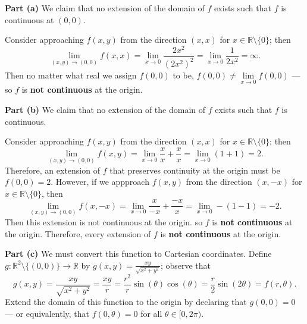 \documentclass[11pt]{article}
\begin{document}
\textbf{Part (a)} We claim that no extension of the domain of $f$ exists such that $f$ is continuous at $(0, 0)$.

Consider approaching $f(x, y)$ from the direction $(x, x)$ for $x \in \mathbb{R} \setminus \{ 0 \}$; then 
\[
	\lim\limits_{(x, y) \to (0, 0)} f(x, x) = \lim\limits_{x \to 0} \frac{2x^{2}}{(2x^{2})^{2}} = \lim\limits_{x \to 0} \frac{1}{2x^{2}} = \infty.
\]
Then no matter what real we assign $f(0, 0)$ to be, $f(0, 0) \ne \lim\limits_{x \to 0} f(0, 0)$ --- so $f$ is \textbf{not continuous} at the origin. 


\textbf{Part (b)} We claim that no extension of the domain of $f$ exists such that $f$ is continuous.

Consider approaching $f(x, y)$ from the direction $(x, x)$ for $x \in \mathbb{R} \setminus \{ 0 \}$; then 
\[
	\lim\limits_{(x, y) \to (0, 0)} f(x, y) = \lim\limits_{x \to 0} \frac{x}{x} + \frac{x}{x} = \lim\limits_{x \to 0} (1 + 1) = 2.
\]
Therefore, an extension of $f$ that preserves continuity at the origin must be $f(0, 0) = 2$. However, if we appproach $f(x, y)$ from the direction $(x, -x)$ for $x \in \mathbb{R} \setminus \{ 0 \}$, then 
\[
	\lim\limits_{(x, y) \to (0, 0)} f(x, -x) = \lim\limits_{x \to 0} \frac{x}{-x} + \frac{-x}{x} = \lim\limits_{x \to 0} -(1 - 1) = -2.
\]
Then this extension is not continuous at the origin. so $f$ is \textbf{not continuous} at the origin. Therefore, every extension of $f$ is \textbf{not continuous} at the origin.


\textbf{Part (c)} We must convert this function to Cartesian coordinates. Define $g: \mathbb{R}^{2} \setminus \{ (0, 0) \} \to \mathbb{R}$ by $g(x, y) = \tfrac{xy}{\sqrt{x^{2} + y^{2}}}$; observe that
\[
	g(x, y) = \frac{xy}{\sqrt{x^{2} + y^{2}}} = \frac{xy}{r} = \frac{r^{2}}{r} \sin(\theta) \cos(\theta) = \frac{r}{2} \sin(2\theta) = f(r, \theta).
\]
Extend the domain of this function to the origin by declaring that $g(0, 0) = 0$ --- or equivalently, that $f(0, \theta) = 0$ for all $\theta \in [0, 2\pi)$.
\end{document}
